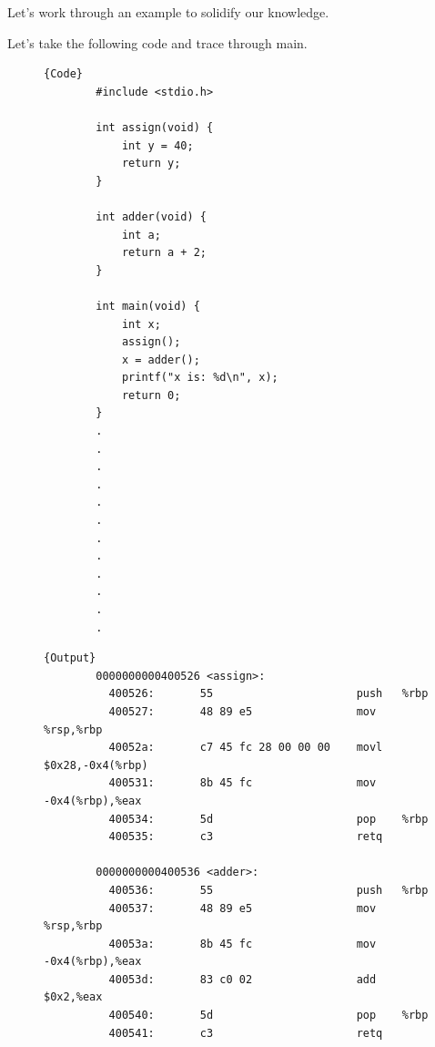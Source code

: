 \documentclass{article}
\begin{document}
  Let's work through an example to solidify our knowledge. 

  \begin{example}
    Let's take the following code and trace through main. 
    \begin{figure}[H]
      \centering 
      \noindent\begin{minipage}{.25\textwidth}
      \begin{lstlisting}[]{Code}
        #include <stdio.h>

        int assign(void) {
            int y = 40;
            return y;
        }

        int adder(void) {
            int a;
            return a + 2;
        }

        int main(void) {
            int x;
            assign();
            x = adder();
            printf("x is: %d\n", x);
            return 0;
        }
        .
        .
        .
        .
        .
        .
        .
        .
        .
        .
        .
        .
      \end{lstlisting}
      \end{minipage}
      \hfill
      \begin{minipage}{.74\textwidth}
      \begin{lstlisting}[]{Output}
        0000000000400526 <assign>:
          400526:       55                      push   %rbp
          400527:       48 89 e5                mov    %rsp,%rbp
          40052a:       c7 45 fc 28 00 00 00    movl   $0x28,-0x4(%rbp)
          400531:       8b 45 fc                mov    -0x4(%rbp),%eax
          400534:       5d                      pop    %rbp
          400535:       c3                      retq

        0000000000400536 <adder>:
          400536:       55                      push   %rbp
          400537:       48 89 e5                mov    %rsp,%rbp
          40053a:       8b 45 fc                mov    -0x4(%rbp),%eax
          40053d:       83 c0 02                add    $0x2,%eax
          400540:       5d                      pop    %rbp
          400541:       c3                      retq


\end{lstlisting}
\end{minipage}
\end{figure}
\end{example}
\end{document}
